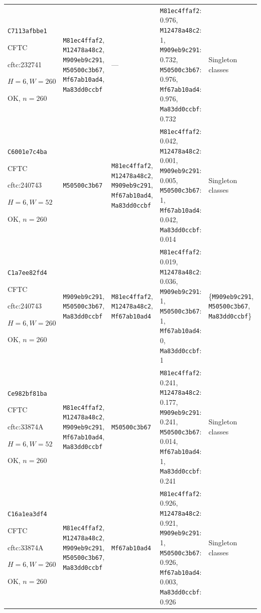\begin{longtable}{p{.15\linewidth}p{.17\linewidth}p{.17\linewidth}p{.25\linewidth}p{.14\linewidth}}
\texttt{C7113afbbe1}\par CFTC\par cftc:232741\par $H=6,W=260$\par OK, $n=260$ & \texttt{M81ec4ffaf2}, \texttt{M12478a48c2}, \texttt{M909eb9c291}, \texttt{M50500c3b67}, \texttt{Mf67ab10ad4}, \texttt{Ma83dd0ccbf} & --- & \texttt{M81ec4ffaf2}: 0.976, \texttt{M12478a48c2}: 1, \texttt{M909eb9c291}: 0.732, \texttt{M50500c3b67}: 0.976, \texttt{Mf67ab10ad4}: 0.976, \texttt{Ma83dd0ccbf}: 0.732 & Singleton classes \\
\texttt{C6001e7c4ba}\par CFTC\par cftc:240743\par $H=6,W=52$\par OK, $n=260$ & \texttt{M50500c3b67} & \texttt{M81ec4ffaf2}, \texttt{M12478a48c2}, \texttt{M909eb9c291}, \texttt{Mf67ab10ad4}, \texttt{Ma83dd0ccbf} & \texttt{M81ec4ffaf2}: 0.042, \texttt{M12478a48c2}: 0.001, \texttt{M909eb9c291}: 0.005, \texttt{M50500c3b67}: 1, \texttt{Mf67ab10ad4}: 0.042, \texttt{Ma83dd0ccbf}: 0.014 & Singleton classes \\
\texttt{C1a7ee82fd4}\par CFTC\par cftc:240743\par $H=6,W=260$\par OK, $n=260$ & \texttt{M909eb9c291}, \texttt{M50500c3b67}, \texttt{Ma83dd0ccbf} & \texttt{M81ec4ffaf2}, \texttt{M12478a48c2}, \texttt{Mf67ab10ad4} & \texttt{M81ec4ffaf2}: 0.019, \texttt{M12478a48c2}: 0.036, \texttt{M909eb9c291}: 1, \texttt{M50500c3b67}: 1, \texttt{Mf67ab10ad4}: 0, \texttt{Ma83dd0ccbf}: 1 & \{\texttt{M909eb9c291}, \texttt{M50500c3b67}, \texttt{Ma83dd0ccbf}\} \\
\texttt{Ce982bf81ba}\par CFTC\par cftc:33874A\par $H=6,W=52$\par OK, $n=260$ & \texttt{M81ec4ffaf2}, \texttt{M12478a48c2}, \texttt{M909eb9c291}, \texttt{Mf67ab10ad4}, \texttt{Ma83dd0ccbf} & \texttt{M50500c3b67} & \texttt{M81ec4ffaf2}: 0.241, \texttt{M12478a48c2}: 0.177, \texttt{M909eb9c291}: 0.241, \texttt{M50500c3b67}: 0.014, \texttt{Mf67ab10ad4}: 1, \texttt{Ma83dd0ccbf}: 0.241 & Singleton classes \\
\texttt{C16a1ea3df4}\par CFTC\par cftc:33874A\par $H=6,W=260$\par OK, $n=260$ & \texttt{M81ec4ffaf2}, \texttt{M12478a48c2}, \texttt{M909eb9c291}, \texttt{M50500c3b67}, \texttt{Ma83dd0ccbf} & \texttt{Mf67ab10ad4} & \texttt{M81ec4ffaf2}: 0.926, \texttt{M12478a48c2}: 0.921, \texttt{M909eb9c291}: 1, \texttt{M50500c3b67}: 0.926, \texttt{Mf67ab10ad4}: 0.003, \texttt{Ma83dd0ccbf}: 0.926 & Singleton classes \\

\end{longtable}

